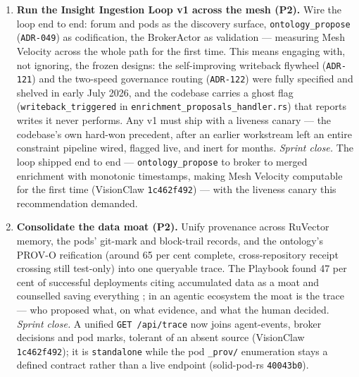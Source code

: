 \begin{enumerate}
  \item \textbf{Run the Insight Ingestion Loop v1 across the mesh (P2).} Wire the loop end to end: forum and pods as the discovery surface, \texttt{ontology\_propose} (\texttt{ADR-049}) as codification, the BrokerActor as validation --- measuring Mesh Velocity across the whole path for the first time. This means engaging with, not ignoring, the frozen designs: the self-improving writeback flywheel (\texttt{ADR-121}) and the two-speed governance routing (\texttt{ADR-122}) were fully specified and shelved in early July 2026, and the codebase carries a ghost flag (\texttt{writeback\_triggered} in \texttt{enrichment\_proposals\_handler.rs}) that reports writes it never performs. Any v1 must ship with a liveness canary --- the codebase's own hard-won precedent, after an earlier workstream left an entire constraint pipeline wired, flagged live, and inert for months. \emph{Sprint close.} The loop shipped end to end --- \texttt{ontology\_propose} to broker to merged enrichment with monotonic timestamps, making Mesh Velocity computable for the first time (VisionClaw \texttt{1c462f492}) --- with the liveness canary this recommendation demanded.

  \item \textbf{Consolidate the data moat (P2).} Unify provenance across RuVector memory, the pods' git-mark and block-trail records, and the ontology's PROV-O reification (around 65 per cent complete, cross-repository receipt crossing still test-only) into one queryable trace. The Playbook found 47 per cent of successful deployments citing accumulated data as a moat and counselled saving everything \parencite{Pereira2026Playbook}; in an agentic ecosystem the moat is the trace --- who proposed what, on what evidence, and what the human decided. \emph{Sprint close.} A unified \texttt{GET /api/trace} now joins agent-events, broker decisions and pod marks, tolerant of an absent source (VisionClaw \texttt{1c462f492}); it is \texttt{standalone} while the pod \texttt{\_prov/} enumeration stays a defined contract rather than a live endpoint (solid-pod-rs \texttt{40043b0}).


\end{enumerate}
